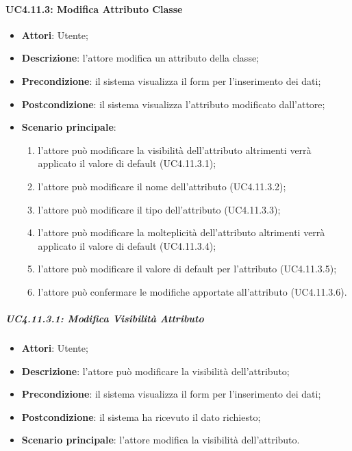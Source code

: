 \paragraph{UC4.11.3: Modifica Attributo Classe}
\label{UC4.11.3}
\begin{itemize}
	\item \textbf{Attori}: Utente;
	\item \textbf{Descrizione}: l'attore modifica un attributo della classe;
	\item \textbf{Precondizione}: il sistema visualizza il form per l'inserimento dei dati;
	\item \textbf{Postcondizione}: il sistema visualizza l'attributo modificato dall'attore;
	\item \textbf{Scenario principale}:
	\begin{enumerate}
	\item l'attore può modificare la visibilità dell'attributo altrimenti verrà applicato il valore di default (UC4.11.3.1);
	\item l'attore può modificare il nome dell'attributo (UC4.11.3.2);
	\item l'attore può modificare il tipo dell'attributo (UC4.11.3.3);
	\item l'attore può modificare la molteplicità dell'attributo altrimenti verrà applicato il valore di default (UC4.11.3.4);
	\item l'attore può modificare il valore di default per l'attributo (UC4.11.3.5);
	\item l'attore può confermare le modifiche apportate all'attributo (UC4.11.3.6).
	\end{enumerate}
\end{itemize}

\subparagraph{UC4.11.3.1: Modifica Visibilità Attributo}
\label{UC4.11.3.1}
\begin{itemize}
	\item \textbf{Attori}: Utente;
	\item \textbf{Descrizione}: l'attore può modificare la visibilità dell'attributo;
	\item \textbf{Precondizione}: il sistema visualizza il form per l'inserimento dei dati;
	\item \textbf{Postcondizione}: il sistema ha ricevuto il dato richiesto;
	\item \textbf{Scenario principale}: l'attore modifica la visibilità dell'attributo.
\end{itemize}

